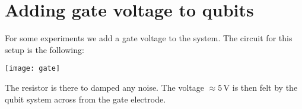 
 \section{Adding gate voltage to qubits}
 For  some experiments  we  add a  gate voltage  to  the system.   The
 circuit for this setup is the following:

\begin{center}
  \texttt{[image: gate]}
\end{center}

The   resistor  is   there   to  damped   any   noise.   The   voltage
$ \approx  5\, $V  is then  felt by the  qubit system  across from  the gate
electrode.

\newpage
